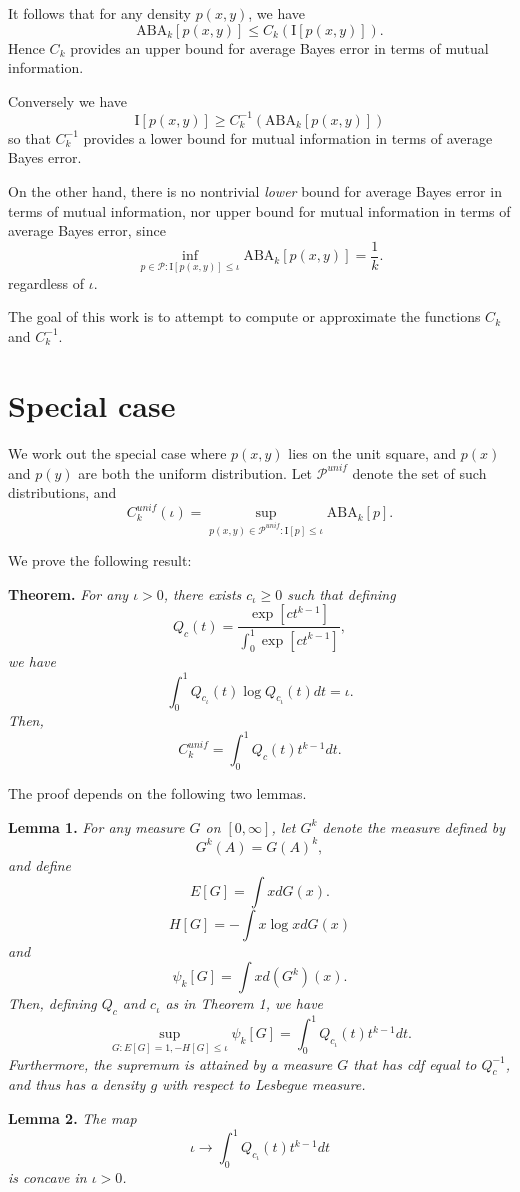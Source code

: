 \documentclass[12pt]{article}
\begin{document}
It follows that for any density $p(x,
y)$, we have
\[
\text{ABA}_k[p(x,y)] \leq C_k(\text{I}[p(x,y)]).
\]
Hence $C_k$ provides an upper bound for average Bayes error in terms of mutual information.

Conversely we have
\[
\text{I}[p(x,y)] \geq C^{-1}_k(\text{ABA}_k[p(x,y)])
\]
so that $C^{-1}_k$ provides a lower bound for mutual information in terms of average Bayes error.

On the other hand, there is no nontrivial \emph{lower} bound for average Bayes error in terms of mutual information,
nor upper bound for mutual information in terms of average Bayes error, since
\[
\inf_{p \in \mathcal{P}: \text{I}[p(x,y)] \leq \iota} \text{ABA}_k[p(x,y)] = \frac{1}{k}.
\]
regardless of $\iota$.

The goal of this work is to attempt to compute or approximate the functions $C_k$ and $C_k^{-1}$.

\section{Special case}

We work out the special case where $p(x,y)$ lies on the unit square, and $p(x)$ and $p(y)$ are both the uniform distribution.
Let $\mathcal{P}^{unif}$ denote the set of such distributions, and 
\[
C_k^{unif}(\iota) = \sup_{p(x, y) \in \mathcal{P}^{unif}: \text{I}[p] \leq \iota} \text{ABA}_k[p]. 
\]

We prove the following result:

\textbf{Theorem.} \emph{
For any $\iota > 0$, there exists $c_\iota \geq 0$ such that defining
\[
Q_c(t) = \frac{\exp[ct^{k-1}]}{\int_0^1 \exp[ct^{k-1}]},
\]
we have
\[
\int_0^1 Q_{c_\iota}(t) \log Q_{c_\iota}(t) dt = \iota.
\]
Then,
\[
C_k^{unif} = \int_0^1 Q_c(t) t^{k-1} dt.
\]
}

The proof depends on the following two lemmas.

\textbf{Lemma 1.} \emph{
For any measure $G$ on $[0, \infty]$,
let $G^k$ denote the measure defined by
\[
G^k(A) = G(A)^k,
\]
and define
\[
E[G] = \int x dG(x).
\]
\[
H[G] = -\int x \log x dG(x)
\]
and
\[
\psi_k[G] = \int x d(G^k)(x).
\]
Then, defining $Q_c$ and $c_\iota$ as in Theorem 1, we have
\[
\sup_{G: E[G] = 1, -H[G] \leq \iota} \psi_k[G] = \int_0^1 Q_{c_\iota}(t) t^{k-1} dt.
\]
Furthermore, the supremum is attained by a measure $G$ that has cdf
equal to $Q_c^{-1}$, and thus has a density $g$ with respect to
Lesbegue measure.  }

\textbf{Lemma 2.} \emph{
The map
\[
\iota \to \int_0^1 Q_{c_\iota}(t) t^{k-1} dt
\]
is concave in $\iota > 0$.
}
\end{document}
